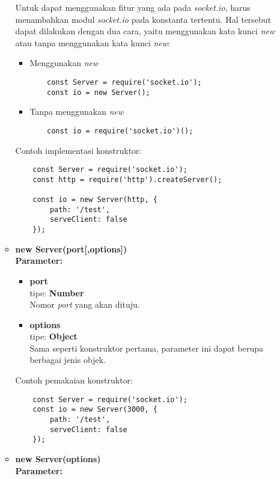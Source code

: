 \begin{enumerate}
\begin{itemize}
		Untuk dapat menggunakan fitur yang ada pada \textit{socket.io}, harus menambahkan modul \textit{socket.io} pada konstanta tertentu. Hal tersebut dapat dilakukan dengan dua cara, yaitu menggunakan kata kunci \textit{new} atau tanpa menggunakan kata kunci \textit{new}:
		
		\begin{itemize}
			\item Menggunakan \textit{new}
			\begin{lstlisting}
	const Server = require('socket.io');
	const io = new Server();
			\end{lstlisting}
			
			\item Tanpa menggunakan \textit{new}
			\begin{lstlisting}
	const io = require('socket.io')();
			\end{lstlisting}
		\end{itemize}
	
	Contoh implementasi konstruktor:
	
	\begin{lstlisting}
	const Server = require('socket.io');
	const http = require('http').createServer();
		
	const io = new Server(http, {
		path: '/test',
		serveClient: false
	});
	\end{lstlisting}
	
	\item \textbf{new Server(port[,options])} \\
	\textbf{Parameter:}
	\begin{itemize}
		\item \textbf{port} \\ tipe: \textbf{Number} \\ Nomor \textit{port} yang akan dituju.
		\item \textbf{options} \\ tipe: \textbf{Object} \\ Sama seperti konstruktor pertama, parameter ini dapat berupa berbagai jenis objek.
	\end{itemize}
	
	Contoh pemakaian konstruktor: 
	\begin{lstlisting}
	const Server = require('socket.io');
	const io = new Server(3000, {
		path: '/test',
		serveClient: false
	});
	\end{lstlisting}
	
	\item \textbf{new Server(options)} \\ 
	\textbf{Parameter:}
	

\end{itemize}
\end{enumerate}
